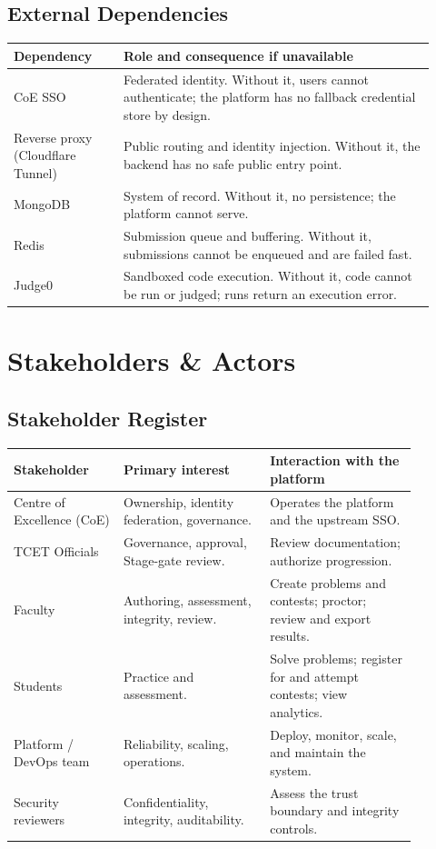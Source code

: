 \documentclass[12pt,a4paper,oneside]{report}
\begin{document}
\section{External Dependencies}
\begin{longtable}{@{}p{0.24\linewidth} p{0.68\linewidth}@{}}
\toprule
\textbf{Dependency} & \textbf{Role and consequence if unavailable}\\
\midrule
\endhead
CoE SSO & Federated identity. Without it, users cannot authenticate; the platform has no fallback credential store by design.\\
Reverse proxy (Cloudflare Tunnel) & Public routing and identity injection. Without it, the backend has no safe public entry point.\\
MongoDB & System of record. Without it, no persistence; the platform cannot serve.\\
Redis & Submission queue and buffering. Without it, submissions cannot be enqueued and are failed fast.\\
Judge0 & Sandboxed code execution. Without it, code cannot be run or judged; runs return an execution error.\\
\bottomrule
\end{longtable}

\chapter{Stakeholders \& Actors}

\section{Stakeholder Register}
\begin{longtable}{@{}p{0.24\linewidth} p{0.32\linewidth} p{0.32\linewidth}@{}}
\toprule
\textbf{Stakeholder} & \textbf{Primary interest} & \textbf{Interaction with the platform}\\
\midrule
\endhead
Centre of Excellence (CoE) & Ownership, identity federation, governance. & Operates the platform and the upstream SSO.\\
TCET Officials & Governance, approval, Stage-gate review. & Review documentation; authorize progression.\\
Faculty & Authoring, assessment, integrity, review. & Create problems and contests; proctor; review and export results.\\
Students & Practice and assessment. & Solve problems; register for and attempt contests; view analytics.\\
Platform / DevOps team & Reliability, scaling, operations. & Deploy, monitor, scale, and maintain the system.\\
Security reviewers & Confidentiality, integrity, auditability. & Assess the trust boundary and integrity controls.\\
\bottomrule
\end{longtable}
\end{document}
